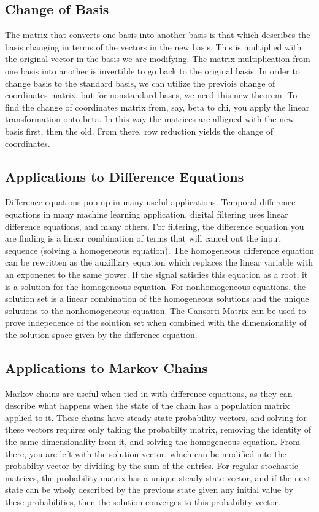 \documentclass[12pt]{article}
\begin{document}
 \subsection{Change of Basis}
 The matrix that converts one basis into another basis is that which describes the basis changing in terms of the vectors in the new basis. 
 This is multiplied with the original vector in the basis we are modifying. The matrix multiplication from one basis into another
 is invertible to go back to the original basis. In order to change basis to the standard basis, we can utilize the previois change of 
 coordinates matrix, but for nonstandard bases, we need this new theorem. To find the change of coordinates matrix from, say, beta to chi, 
 you apply the linear transformation onto beta. In this way the matrices are alligned with the new basis first, then the old. From there, 
 row reduction yields the change of coordinates. 
 \subsection{Applications to Difference Equations}
 Difference equations pop up in many useful applications. Temporal difference equations in many machine learning application, digital 
 filtering uses linear difference equations, and many others. For filtering, the difference equation you are finding is a linear combination
 of terms that will cancel out the input sequence (solving a homogeneous equation). The homogeneous difference equation can be rewritten as the 
 auxilliary equation which replaces the linear variable with an exponenet to the same power. If the signal satisfies this equation as a root, it 
 is a solution for the homogeneous equation. For nonhomogeneous equations, the solution set is a linear combination of the homogeneous solutions
 and the unique solutions to the nonhomogeneous equation. The Cansorti Matrix can be used to prove indepedence of the solution set when 
 combined with the dimensionality of the solution space given by the difference equation.
 \subsection{Applications to Markov Chains}
 Markov chains are useful when tied in with difference equations, as they can describe what happens when the state of the chain has a population 
 matrix applied to it. These chains have steady-state probability vectors, and solving for these vectors requires only taking the probabilty 
 matrix, removing the identity of the same dimensionality from it, and solving the homogeneous equation. From there, you are left with the 
 solution vector, which can be modified into the probabilty vector by dividing by the sum of the entries. For regular stochastic matrices, 
 the probability matrix has a unique steady-state vector, and if the next state can be wholy described by the previous state given any 
 initial value by these probabilities, then the solution converges to this probability vector. 
    
\end{document}
